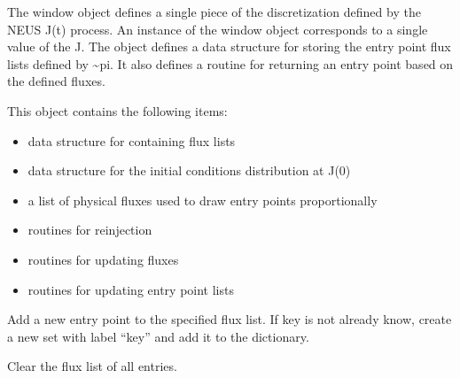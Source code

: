 \documentclass[letterpaper,10pt,english]{sphinxmanual}
\begin{document}
\begin{fulllineitems}
\label{applications/applications.doc:window.window}
The window object defines a single piece of the discretization defined by the NEUS J(t) process. An instance of the window object corresponds to a single value of the J. The object defines a data structure for storing the entry point flux lists defined by \textasciitilde{}pi. It also defines a routine for returning an entry point based on the defined fluxes.

This object contains the following items:
\begin{itemize}
\item {} 
data structure for containing flux lists

\item {} 
data structure for the initial conditions distribution at J(0)

\item {} 
a list of physical fluxes used to draw entry points proportionally

\item {} 
routines for reinjection

\item {} 
routines for updating fluxes

\item {} 
routines for updating entry point lists

\end{itemize}

\begin{fulllineitems}
\label{applications/applications.doc:window.window.add_entry_point}
Add a new entry point to the specified flux list. If key is not already know, create a new set with label ``key'' and add it to the dictionary.

\end{fulllineitems}


\begin{fulllineitems}
\label{applications/applications.doc:window.window.clear_flux_list}
Clear the flux list of all entries.


\end{fulllineitems}
\end{fulllineitems}
\end{document}
